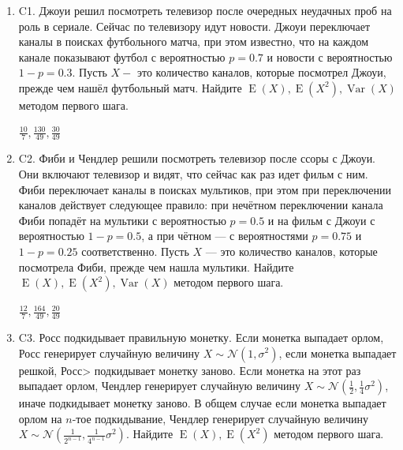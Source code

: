 \documentclass[12pt]{article}
\DeclareMathOperator{\Var}{Var}
\DeclareMathOperator{\E}{E}
\def \cN{\mathcal{N}}
\newenvironment{problem}{}{}
\newenvironment{sol}{}{} %
\begin{document}
\begin{enumerate}
\begin{problem}
\item[C1.] Джоуи решил посмотреть телевизор после очередных неудачных проб на роль в сериале. Сейчас по телевизору идут новости. Джоуи переключает каналы в поисках футбольного матча, при этом известно, что на каждом канале показывают футбол с вероятностью $p=0.7$ и новости с вероятностью $1-p=0.3$. Пусть $X -$ это количество каналов, которые посмотрел Джоуи, прежде чем нашёл футбольный матч. Найдите $\E(X), \E(X^2), \Var(X)$ методом первого шага.

\begin{sol}
$\frac{10}{7},\frac{130}{49},\frac{30}{49}$
\end{sol}
\end{problem}

\begin{problem}
\item[C2.] Фиби и Чендлер решили посмотреть телевизор после ссоры с Джоуи. Они включают телевизор и видят, что сейчас как раз идет фильм с ним. Фиби переключает каналы в поисках мультиков, при этом при переключении каналов действует следующее правило: при нечётном переключении канала Фиби попадёт на мультики с вероятностью $p=0.5$ и на фильм с Джоуи с вероятностью $1-p=0.5$, а при чётном — с вероятностями $p=0.75$ и $1-p=0.25$ соответственно. Пусть $X$ — это количество каналов, которые посмотрела Фиби, прежде чем нашла мультики. Найдите $\E(X), \E(X^2), \Var(X)$ методом первого шага.

\begin{sol}
$\frac{12}{7},\frac{164}{49},\frac{20}{49}$
\end{sol}
\end{problem}

\begin{problem}
\item[C3.] Росс подкидывает правильную монетку. Если монетка выпадает орлом, Росс генерирует случайную величину $X\sim \cN(1,\sigma^2)$, если монетка выпадает решкой, Росс> подкидывает монетку заново. Если монетка на этот раз выпадает орлом, Чендлер генерирует случайную величину $X\sim \cN(\frac{1}{2},\frac{1}{4}\sigma^2)$, иначе подкидывает монетку заново. В общем случае если монетка выпадает орлом на $n$-тое подкидывание, Чендлер  генерирует случайную величину $X\sim \cN \left(\frac{1}{2^{n-1}},\frac{1}{4^{n-1}}\sigma^2 \right)$. Найдите $\E(X), \E(X^2)$ методом первого шага.


\end{problem}
\end{enumerate}
\end{document}
